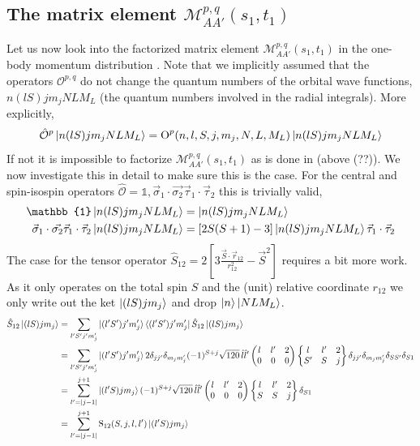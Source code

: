 \documentclass[10pt]{article}
\def\threej#1{\inthreej(#1)}
\def\inthreej(#1,#2,#3,#4,#5,#6){\begin{pmatrix}#1 & #2 & #3 \\ #4 & #5 & #6 \end{pmatrix}}
\def\sixj#1{\insixj(#1)}
\def\insixj(#1,#2,#3,#4,#5,#6){\begin{Bmatrix}#1 & #2 & #3 \\ #4 & #5 & #6 \end{Bmatrix}}
\begin{document}
\subsection{The matrix element $\mathcal{M}_{A A'}^{p,q}(s_1,t_1)$}
Let us now look into the factorized matrix element $\mathcal{M}_{A A'}^{p,q}(s_1,t_1)$ in the one-body momentum distribution . Note that we implicitly assumed that the operators $\mathcal{O}^{p,q}$ do not change the quantum numbers of the orbital wave functions, $ n (lS) j m_j N L M_L$ (the quantum numbers involved in the radial integrals). More explicitly,
\begin{align*}
	\hat{\mathcal{O}}^{p} \ket{ n (lS) j m_j N L M_L } = \text{O}^{p}(n,l,S,j,m_j,N,L,M_L) \ket{ n (lS) j m_j N L M_L }
\end{align*}
If not it is impossible to factorize $\mathcal{M}_{A A'}^{p,q}(s_1,t_1)$ as is done in (above (??)). We now investigate this in detail to make sure this is the case.
For the central and spin-isospin operators $\hat{\mathcal{O}} = \mathbb{1}, \vec{\sigma}_{1} \cdot \vec{\sigma_{2}} \vec{ \tau}_{1} \cdot \vec{ \tau}_{2} $ this is trivially valid,
\begin{align*}
	\mathbb{1} \ket{ n (lS) j m_j N L M_L } &= \ket{ n (lS) j m_j N L M_L } \\
	\vec{\sigma}_{1} \cdot \vec{\sigma_{2}} \vec{ \tau}_{1} \cdot \vec{ \tau}_{2} \ket{ n (lS) j m_j N L M_L } &= \left[ 2 S(S+1) - 3 \right] \ket{ n (lS) j m_j N L M_L } \vec{ \tau}_{1} \cdot \vec{ \tau}_{2}
\end{align*}
The case for the tensor operator $\hat{S}_{12} = 2 \left[ 3 \frac{ \vec{S} \cdot \vec{r}_{12}}{r_{12}^{2}} - \vec{S}^{2} \right]$ requires a bit more work. As it only operates on the total spin $S$ and the (unit) relative coordinate $r_{12}$ we only write out the ket $\ket{ (l S) j m_j}$ and drop $ \ket{n} \ket{ N L M_L}$.
\begin{align*}
	\hat{S}_{12} \ket{ (lS) j m_j} &= \sum_{l' S' j' m_j'} \ket{ (l' S') j' m_j' } \bra{ (l' S') j' m_j'} \hat{S}_{12} \ket{ (lS) j m_j} \\
	&= \sum_{l' S' j' m_j'} \ket{ (l' S') j' m_j' } 2 \delta_{jj'} \delta_{m_j m_j'} (-1)^{S+j} \sqrt{ 120 } \, \hat{l} \hat{l}' \threej{l,l',2,0,0,0} \sixj{l,l',2,S',S,j} \delta_{jj'} \delta_{m_j m_j'} \delta_{S S'} \delta_{S1} \\
	&= \sum_{l'=|j-1|}^{j+1} \ket{ (l' S) j m_j } (-1)^{S+j} \sqrt{ 120 } \, \hat{l} \hat{l}' \threej{l,l',2,0,0,0} \sixj{l,l',2,S,S,j} \delta_{S1} \\
	&= \sum_{l'=|j-1|}^{j+1} \text{S}_{12}(S,j,l,l') \ket{ (l' S) j m_j }
\end{align*}
\end{document}

